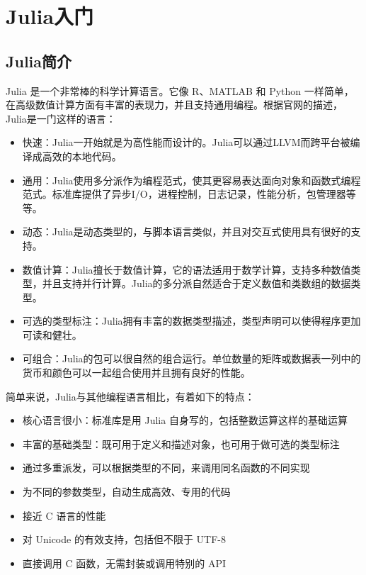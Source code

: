\chapter{Julia入门}\label{ch1}

\section{Julia简介}\label{sec1-1}

Julia 是一个非常棒的科学计算语言。它像 R、MATLAB 和 Python 一样简单，在高级数值计算方面有丰富的表现力，并且支持通用编程。根据官网的描述，Julia是一门这样的语言\cite{Juliadevelopers2018}：

\begin{itemize}
	\item 快速：Julia一开始就是为高性能而设计的。Julia可以通过LLVM而跨平台被编译成高效的本地代码。
	\item 通用：Julia使用多分派作为编程范式，使其更容易表达面向对象和函数式编程范式。标准库提供了异步I/O，进程控制，日志记录，性能分析，包管理器等等。
    \item 动态：Julia是动态类型的，与脚本语言类似，并且对交互式使用具有很好的支持。
    \item 数值计算：Julia擅长于数值计算，它的语法适用于数学计算，支持多种数值类型，并且支持并行计算。Julia的多分派自然适合于定义数值和类数组的数据类型。
    \item 可选的类型标注：Julia拥有丰富的数据类型描述，类型声明可以使得程序更加可读和健壮。
    \item 可组合：Julia的包可以很自然的组合运行。单位数量的矩阵或数据表一列中的货币和颜色可以一起组合使用并且拥有良好的性能。
\end{itemize}

简单来说，Julia与其他编程语言相比，有着如下的特点\cite{Julia2023}：

\begin{itemize}
    \item 核心语言很小：标准库是用 Julia 自身写的，包括整数运算这样的基础运算
    \item 丰富的基础类型：既可用于定义和描述对象，也可用于做可选的类型标注
    \item 通过多重派发，可以根据类型的不同，来调用同名函数的不同实现
    \item 为不同的参数类型，自动生成高效、专用的代码
    \item 接近 C 语言的性能
    \item 对 Unicode 的有效支持，包括但不限于 UTF-8
    \item 直接调用 C 函数，无需封装或调用特别的 API
\end{itemize}

